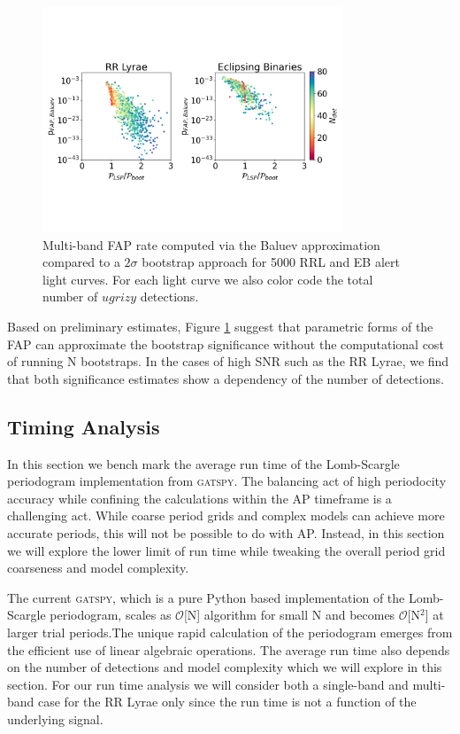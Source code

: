 \documentclass[DM,authoryear,toc]{lsstdoc}
\begin{document}
\begin{figure}
  \includegraphics[width=0.8\textwidth]{figures/fap_approximation_mlsp.pdf}
  \centering 
  \caption{Multi-band FAP rate computed via the Baluev approximation compared to a $2\sigma$ bootstrap approach for 5000 RRL and EB alert light curves.
For each light curve we also color code the total number of $ugrizy$ detections.}
  \label{fig:boot}
\end{figure}

Based on preliminary estimates, Figure \ref{fig:boot} suggest that parametric forms of the FAP can approximate the bootstrap significance without the computational cost of running N bootstraps.
In the cases of high SNR such as the RR Lyrae, we find that both significance estimates show a dependency of the number of detections.

\subsection{Timing Analysis}

In this section we bench mark the average run time of the Lomb-Scargle periodogram implementation from \textsc{gatspy}.
The balancing act of high periodocity accuracy while confining the calculations within the AP timeframe is a challenging act.
While coarse period grids  and complex models can achieve more accurate periods, this will not be possible to do with AP.
Instead, in this section we will explore the lower limit of run time while tweaking the overall period grid coarseness and model complexity.

The current \textsc{gatspy}, which is a pure Python based implementation of the Lomb-Scargle periodogram, scales as  $\mathcal{O}$[N] algorithm for small N and becomes $\mathcal{O}$[N$^2$] at larger trial periods.The unique rapid calculation of the periodogram emerges from the efficient use of linear algebraic operations.
The average run time also depends on the number of detections and model complexity which we will explore in this section.
For our run time analysis we will consider both a single-band and multi-band case for the RR Lyrae only since the run time is not a function of the underlying signal.
\end{document}
